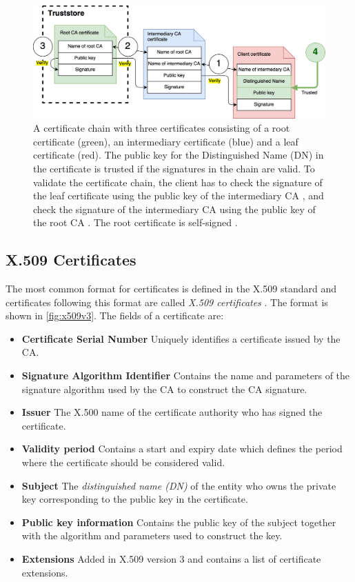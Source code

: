 \documentclass{style/kththesis}
\newcommand*\ding[1]{\raisebox{.8pt}{\textcircled{\raisebox{-.9pt} {#1}}}}
\begin{document}
\begin{figure}
    \centering
    \includegraphics[width=\textwidth]{figures/fig-chain}
    \caption{A certificate chain with three certificates consisting of a root certificate (green), an intermediary certificate (blue) and a leaf certificate (red). The public key for the Distinguished Name (DN) in the certificate is trusted \ding{4} if the signatures in the chain are valid. To validate the certificate chain, the client has to check the signature of the leaf certificate using the public key of the intermediary CA \ding{1}, and check the signature of the intermediary CA using the public key of the root CA \ding{2}. The root certificate is self-signed \ding{3}.}
    \label{fig:chain}
\end{figure}

\subsection{X.509 Certificates}
The most common format for certificates is defined in the X.509 standard and certificates following this format are called \textit{X.509 certificates} \cite{Ford00}. The format is shown in \cref{fig:x509v3}. The fields of a certificate are:
\begin{itemize}
    \item \textbf{Certificate Serial Number} Uniquely identifies a certificate issued by the CA.
    \item \textbf{Signature Algorithm Identifier} Contains the name and parameters of the signature algorithm used by the CA to construct the CA signature.
    \item \textbf{Issuer} The X.500 name of the certificate authority who has signed the certificate.
    \item \textbf{Validity period} Contains a start and expiry date which defines the period where the certificate should be considered valid.
    \item \textbf{Subject} The \emph{distinguished name (DN)} of the entity who owns the private key corresponding to the public key in the certificate.
    \item \textbf{Public key information} Contains the public key of the subject together with the algorithm and parameters used to construct the key.
    \item \textbf{Extensions} Added in X.509 version 3 and contains a list of certificate extensions.
\end{itemize} 
\end{document}
